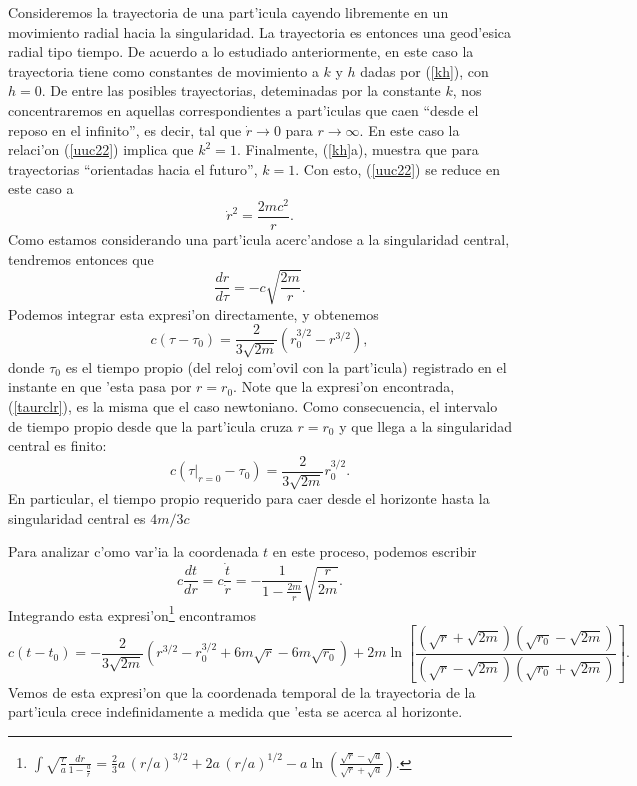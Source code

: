 Consideremos la trayectoria de una part'icula cayendo libremente en un movimiento radial hacia la singularidad. La trayectoria es entonces una geod'esica radial tipo tiempo. De acuerdo a lo estudiado anteriormente, en este caso la trayectoria tiene como constantes de movimiento a $k$ y $h$ dadas por (\ref{kh}), con $h=0$. De entre las posibles trayectorias, deteminadas por la constante $k$, nos concentraremos en aquellas correspondientes a part'iculas que caen  ``desde el reposo en el infinito'', es decir, tal que $\dot{r}\to 0$ para $r\to\infty$. En este caso la relaci'on (\ref{uuc22}) implica que $k^2=1$. Finalmente, (\ref{kh}a), muestra que para trayectorias ``orientadas hacia el futuro'', $k=1$. Con esto, (\ref{uuc22}) se reduce en este caso a
\begin{equation}
\dot{r}^2 =\frac{2mc^2}{r} .\label{pi1}
\end{equation}
Como estamos considerando una part'icula acerc'andose a la singularidad central, tendremos entonces que
\begin{equation}
\frac{dr}{d\tau}=-c\sqrt{\frac{2m}{r}} .
\end{equation}
Podemos integrar esta expresi'on directamente, y obtenemos
\begin{equation}
 c(\tau-\tau_0)=\frac{2}{3\sqrt{2m}}\left(r_0^{3/2}-r^{3/2}\right), \label{taurclr}
\end{equation}
donde $\tau_0$ es el tiempo propio (del reloj com'ovil con la part'icula) registrado en el instante en que 'esta pasa por $r=r_0$. Note que la expresi'on encontrada, (\ref{taurclr}), es la misma que el caso newtoniano. Como consecuencia, el intervalo de tiempo propio desde que la part'icula cruza $r=r_0$ y que llega a la singularidad central es finito:
\begin{equation}
 c(\tau|_{r=0}-\tau_0)=\frac{2}{3\sqrt{2m}}r_0^{3/2}.
\end{equation}
En particular, el tiempo propio requerido para caer desde el horizonte hasta la singularidad central es $4m/3c$

Para analizar c'omo var'ia la coordenada $t$ en este proceso, podemos escribir
\begin{equation}
 c\frac{dt}{dr}=c\frac{\dot{t}}{\dot{r}}=-\frac{1}{1-\frac{2m}{r}}\sqrt{\frac{r}{2m}}.
\end{equation}
Integrando esta expresi'on\footnote{$\int\sqrt{\frac{r}{a}}\frac{dr}{1-\frac{a}{r}}=\frac{2}{3}a\, (r/a)^{3/2}+2a\,(r/a)^{1/2}-a\ln\left(\frac{\sqrt{r}-\sqrt{a}}{\sqrt{r}+\sqrt{a}}\right) $.} encontramos
\begin{equation}
c(t-t_0)=-\frac{2}{3\sqrt{2m}}\left(r^{3/2} -r_0^{3/2}+6m\sqrt{r}-6m\sqrt{r_0}\right)+2m\ln\left[\frac{(\sqrt{r}+\sqrt{2m})(\sqrt{r_0}-\sqrt{2m})}{(\sqrt{r}-\sqrt{2m})(\sqrt{r_0}+\sqrt{2m})}\right].
\end{equation}
Vemos de esta expresi'on que la coordenada temporal de la trayectoria de la part'icula crece indefinidamente a medida que 'esta se acerca al horizonte.

